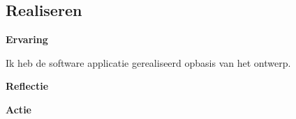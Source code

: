\subsection{Realiseren}
\textbf{Ervaring}

\whitespace
Ik heb de software applicatie gerealiseerd opbasis van het ontwerp.

\whitespace
\textbf{Reflectie}

\whitespace
{}

\whitespace
\textbf{Actie}

\whitespace
{}


